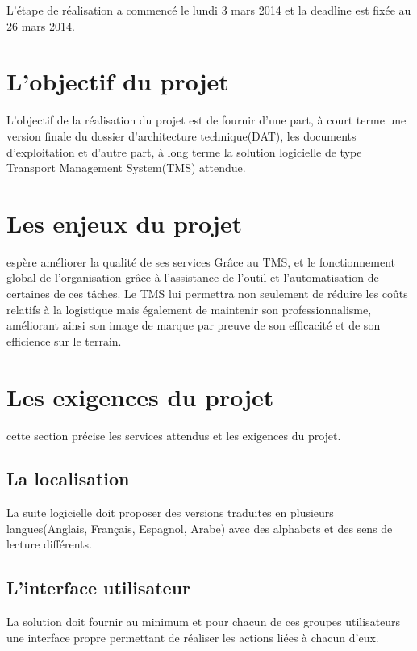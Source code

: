 L'étape de réalisation a commencé le lundi 3 mars 2014 et la deadline est fixée au 26 mars 2014.

\section{L'objectif du projet}
 L'objectif de la réalisation du projet est  de fournir d'une part, à court terme une version finale du dossier d'architecture technique(DAT), les documents d'exploitation et d'autre part, à long terme la solution logicielle de type Transport Management System(TMS) attendue.
 
 \section{Les enjeux du projet}
\mo espère améliorer la qualité de ses services Grâce au TMS, et le fonctionnement global de l'organisation grâce à l'assistance de l'outil et l'automatisation de certaines de ces tâches. Le TMS lui permettra non seulement de réduire les coûts relatifs à la logistique mais également de maintenir son professionnalisme, améliorant ainsi son image de marque par preuve de son efficacité et de son efficience sur le terrain.

\section{Les exigences du projet}
cette section précise les services attendus et les exigences du projet.

\subsection{La localisation}
La suite logicielle doit proposer des versions traduites en plusieurs langues(Anglais, Français, Espagnol, Arabe) avec des alphabets et des sens de lecture différents.

\subsection{L'interface utilisateur}
La solution doit fournir au minimum et pour chacun de ces groupes utilisateurs une interface propre permettant de réaliser les actions liées à chacun d'eux.

